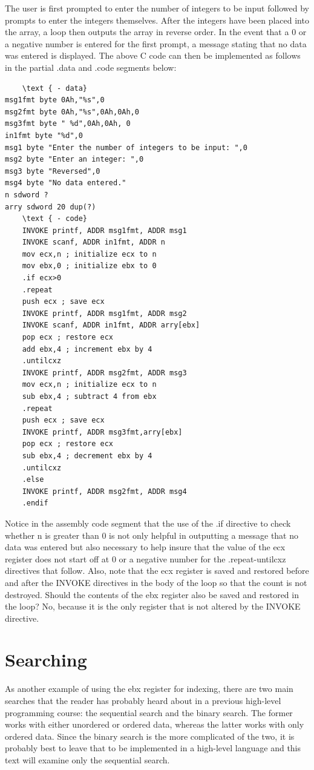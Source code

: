 \documentclass[10pt]{book}
\begin{document}
The user is first prompted to enter the number of integers to be input followed by prompts to enter the integers themselves. After the integers have been placed into the array, a loop then outputs the array in reverse order. In the event that a 0 or a negative number is entered for the first prompt, a message stating that no data was entered is displayed. The above C code can then be implemented as follows in the partial .data and .code segments below:


\begin{verbatim}
    \text { - data}
msg1fmt byte 0Ah,"%s",0
msg2fmt byte 0Ah,"%s",0Ah,0Ah,0
msg3fmt byte " %d",0Ah,0Ah, 0
in1fmt byte "%d",0
msg1 byte "Enter the number of integers to be input: ",0
msg2 byte "Enter an integer: ",0
msg3 byte "Reversed",0
msg4 byte "No data entered."
n sdword ?
arry sdword 20 dup(?)
    \text { - code}
    INVOKE printf, ADDR msg1fmt, ADDR msg1
    INVOKE scanf, ADDR in1fmt, ADDR n
    mov ecx,n ; initialize ecx to n
    mov ebx,0 ; initialize ebx to 0
    .if ecx>0
    .repeat
    push ecx ; save ecx
    INVOKE printf, ADDR msg1fmt, ADDR msg2
    INVOKE scanf, ADDR in1fmt, ADDR arry[ebx]
    pop ecx ; restore ecx
    add ebx,4 ; increment ebx by 4
    .untilcxz
    INVOKE printf, ADDR msg2fmt, ADDR msg3
    mov ecx,n ; initialize ecx to n
    sub ebx,4 ; subtract 4 from ebx
    .repeat
    push ecx ; save ecx
    INVOKE printf, ADDR msg3fmt,arry[ebx]
    pop ecx ; restore ecx
    sub ebx,4 ; decrement ebx by 4
    .untilcxz
    .else
    INVOKE printf, ADDR msg2fmt, ADDR msg4
    .endif
\end{verbatim}

Notice in the assembly code segment that the use of the .if directive to check whether n is greater than 0 is not only helpful in outputting a message that no data was entered but also necessary to help insure that the value of the ecx register does not start off at 0 or a negative number for the .repeat-untilcxz directives that follow. Also, note that the ecx register is saved and restored before and after the INVOKE directives in the body of the loop so that the count is not destroyed. Should the contents of the ebx register also be saved and restored in the loop? No, because it is the only register that is not altered by the INVOKE directive.

\section{Searching}
As another example of using the ebx register for indexing, there are two main searches that the reader has probably heard about in a previous high-level programming course: the sequential search and the binary search. The former works with either unordered or ordered data, whereas the latter works with only ordered data. Since the binary search is the more complicated of the two, it is probably best to leave that to be implemented in a high-level language and this text will examine only the sequential search.
\end{document}
